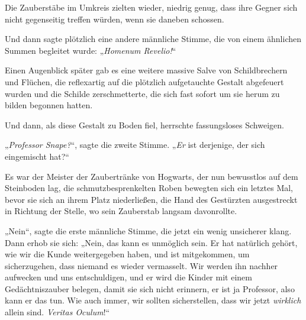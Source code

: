 Die Zauberstäbe im Umkreis zielten wieder, niedrig genug, dass ihre Gegner sich nicht gegenseitig treffen würden, wenn sie daneben schossen.

Und dann sagte plötzlich eine andere männliche Stimme, die von einem ähnlichen Summen begleitet wurde: „\emph{Homenum Revelio!}“

Einen Augenblick später gab es eine weitere massive Salve von Schildbrechern und Flüchen, die reflexartig auf die plötzlich aufgetauchte Gestalt abgefeuert wurden und die Schilde zerschmetterte, die sich fast sofort um sie herum zu bilden begonnen hatten.

Und dann, als diese Gestalt zu Boden fiel, herrschte fassungsloses Schweigen.

„\emph{Professor Snape?}“, sagte die zweite Stimme. „\emph{Er} ist derjenige, der sich eingemischt hat?“

Es war der Meister der Zaubertränke von Hogwarts, der nun bewusstlos auf dem Steinboden lag, die schmutzbesprenkelten Roben bewegten sich ein letztes Mal, bevor sie sich an ihrem Platz niederließen, die Hand des Gestürzten ausgestreckt in Richtung der Stelle, wo sein Zauberstab langsam davonrollte.

„Nein“, sagte die erste männliche Stimme, die jetzt ein wenig unsicherer klang. Dann erhob sie sich: „Nein, das kann es unmöglich sein. Er hat natürlich gehört, wie wir die Kunde weitergegeben haben, und ist mitgekommen, um sicherzugehen, dass niemand es wieder vermasselt. Wir werden ihn nachher aufwecken und uns entschuldigen, und er wird die Kinder mit einem Gedächtniszauber belegen, damit sie sich nicht erinnern, er ist ja Professor, also kann er das tun. Wie auch immer, wir sollten sicherstellen, dass wir jetzt \emph{wirklich} allein sind. \emph{Veritas Oculum}!“

